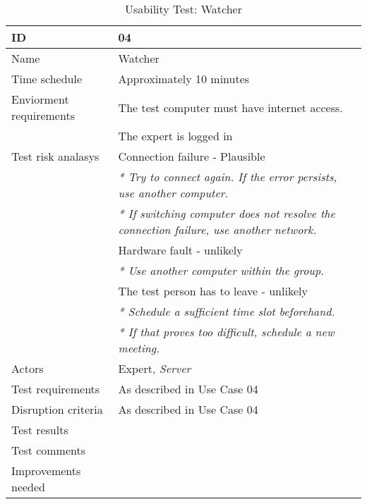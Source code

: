 {\footnotesize
\begin{table}[H]
\begin{tabular}{| p{5cm} | p{10cm} |}\hline
	\textbf{ID}	& \textbf{04} \\ \hline
	Name		& Watcher \\ \hline
	Time schedule	& Approximately 10 minutes\\ \hline
	Enviorment requirements 
		& The test computer must have internet access. \\ 
		& The expert is logged in\\ \hline
	Test risk analasys 
		& Connection failure - Plausible \\
		& \emph{* Try to connect again. If the error persists, use another computer.} \\
		& \emph{* If switching computer does not resolve the connection failure, use another network.}\\
		& Hardware fault - unlikely \\
		& \emph{* Use another computer within the group.} \\
		& The test person has to leave - unlikely \\
		& \emph{* Schedule a sufficient time slot beforehand.} \\
		& \emph{* If that proves too difficult, schedule a new meeting.}\\ \hline
	Actors	& Expert, \emph{Server}\\ \hline
	Test requirements & As described in Use Case 04 \\ \hline
	Disruption criteria & As described in Use Case 04  \\ \hline
	Test results 
		& \\ \hline
	Test comments
		& \\ \hline
	Improvements needed
		& \\ \hline
\end{tabular}


\caption{Usability Test: Watcher}
\label{fig:usability_test_4}
\end{table}}



